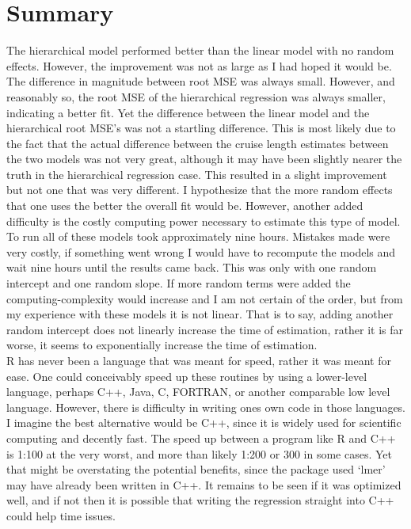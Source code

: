 \documentclass{article}
\begin{document}
\section{Summary}
The hierarchical model performed better than the linear model with no random effects. However, the improvement was not as large as I had hoped it would be. The difference in magnitude between root MSE was always small. However, and reasonably so, the root MSE of the hierarchical regression was always smaller, indicating a better fit. Yet the difference between the linear model and the hierarchical root MSE's was not a startling difference. This is most likely due to the fact that the actual difference between the cruise length estimates between the two models was not very great, although it may have been slightly nearer the truth in the hierarchical regression case. This resulted in a slight improvement but not one that was very different. I hypothesize that the more random effects that one uses the better the overall fit would be. However, another added difficulty is the costly computing power necessary to estimate this type of model. To run all of these models took approximately nine hours. Mistakes made were very costly, if something went wrong I would have to recompute the models and wait nine hours until the results came back. This was only with one random intercept and one random slope. If more random terms were added the computing-complexity would increase and I am not certain of the order, but from my experience with these models it is not linear. That is to say, adding another random intercept does not linearly increase the time of estimation, rather it is far worse, it seems to exponentially increase the time of estimation. \\

R has never been a language that was meant for speed, rather it was meant for ease. One could conceivably speed up these routines by using a lower-level language, perhaps C++, Java, C, FORTRAN, or another comparable low level language. However, there is difficulty in writing ones own code in those languages. I imagine the best alternative would be C++, since it is widely used for scientific computing and decently fast. The speed up between a program like R and C++ is 1:100 at the very worst, and more than likely 1:200 or 300 in some cases. Yet that might be overstating the potential benefits, since the package used `lmer' may have already been written in C++. It remains to be seen if it was optimized well, and if not then it is possible that writing the regression straight into C++ could help time issues.  \\
\end{document}
